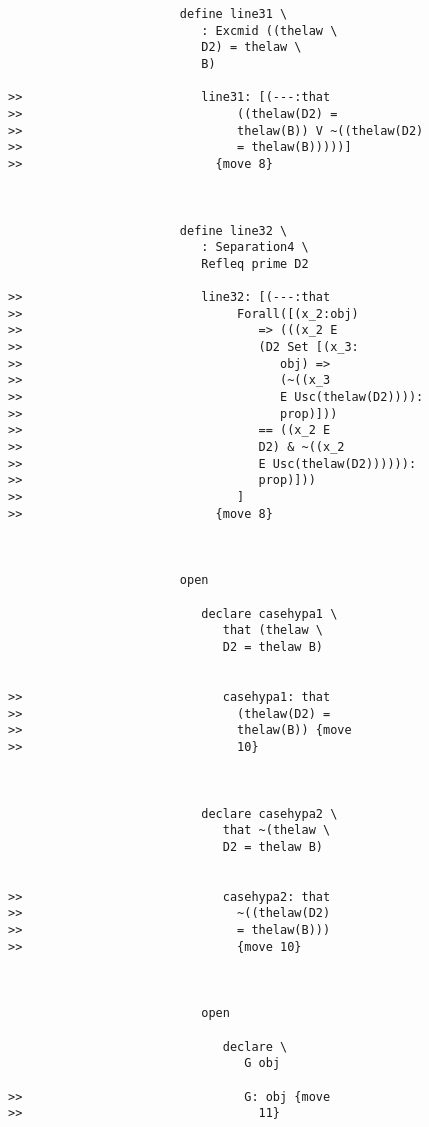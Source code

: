 \documentclass[12pt]{article}
\begin{document}
\begin{verbatim}
                        define line31 \
                           : Excmid ((thelaw \
                           D2) = thelaw \
                           B)

>>                         line31: [(---:that
>>                              ((thelaw(D2) =
>>                              thelaw(B)) V ~((thelaw(D2)
>>                              = thelaw(B)))))]
>>                           {move 8}



                        define line32 \
                           : Separation4 \
                           Refleq prime D2

>>                         line32: [(---:that
>>                              Forall([(x_2:obj)
>>                                 => (((x_2 E
>>                                 (D2 Set [(x_3:
>>                                    obj) =>
>>                                    (~((x_3
>>                                    E Usc(thelaw(D2)))):
>>                                    prop)]))
>>                                 == ((x_2 E
>>                                 D2) & ~((x_2
>>                                 E Usc(thelaw(D2)))))):
>>                                 prop)]))
>>                              ]
>>                           {move 8}



                        open

                           declare casehypa1 \
                              that (thelaw \
                              D2 = thelaw B)


>>                            casehypa1: that
>>                              (thelaw(D2) =
>>                              thelaw(B)) {move
>>                              10}



                           declare casehypa2 \
                              that ~(thelaw \
                              D2 = thelaw B)


>>                            casehypa2: that
>>                              ~((thelaw(D2)
>>                              = thelaw(B)))
>>                              {move 10}



                           open

                              declare \
                                 G obj

>>                               G: obj {move
>>                                 11}




\end{verbatim}
\end{document}
